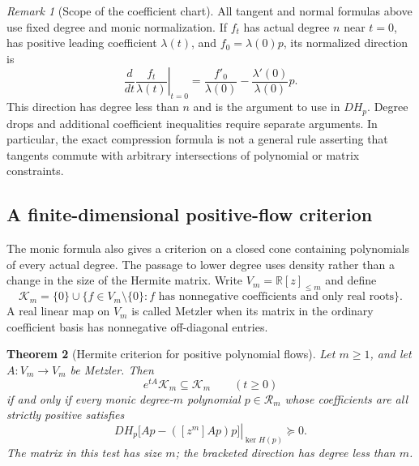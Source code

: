 \documentclass[reqno]{amsart}
\newtheorem{theorem}{Theorem}[section]
\theoremstyle{definition}
\theoremstyle{remark}
\newtheorem{remark}[theorem]{Remark}
\newcommand{\R}{\mathbb R}
\begin{document}
\begin{remark}[Scope of the coefficient chart]
\label{herm:scope}
All tangent and normal formulas above use fixed degree and monic
normalization.  If $f_t$ has actual degree $n$ near $t=0$, has positive
leading coefficient $\lambda(t)$, and $f_0=\lambda(0)p$, its normalized
direction is
\[
 \left.\frac{d}{dt}\frac{f_t}{\lambda(t)}\right|_{t=0}
       =\frac{f'_0}{\lambda(0)}
        -\frac{\lambda'(0)}{\lambda(0)}p.
\]
This direction has degree less than $n$ and is the argument to use in
$DH_p$.  Degree drops and additional coefficient inequalities require
separate arguments.  In particular, the exact compression formula is
not a general rule asserting that tangents commute with arbitrary
intersections of polynomial or matrix constraints.
\end{remark}

\subsection{A finite-dimensional positive-flow criterion}

The monic formula also gives a criterion on a closed cone containing
polynomials of every actual degree.  The passage to lower degree uses
density rather than a change in the size of the Hermite matrix.
Write $V_m=\R[z]_{\leq m}$ and define
\[
 \mathcal K_m=\{0\}\cup
 \{f\in V_m\setminus\{0\}: f\text{ has nonnegative coefficients
                                      and only real roots}\}.
\]
A real linear map on $V_m$ is called Metzler when its matrix in the
ordinary coefficient basis has nonnegative off-diagonal entries.

\begin{theorem}[Hermite criterion for positive polynomial flows]
\label{herm:positive-flow}
Let $m\geq1$, and let $A:V_m\to V_m$ be Metzler.  Then
\[
 e^{tA}\mathcal K_m\subseteq\mathcal K_m\qquad(t\geq0)
\]
if and only if every monic degree-$m$ polynomial $p\in\mathcal R_m$
whose coefficients are all strictly positive satisfies
\begin{equation}
 \left.DH_p\bigl[Ap-([z^m]Ap)p\bigr]\right|_{\ker H(p)}\succeq0.
 \label{herm:positive-flow-test}
\end{equation}
The matrix in this test has size $m$; the bracketed direction has degree
less than $m$.
\end{theorem}
\end{document}
